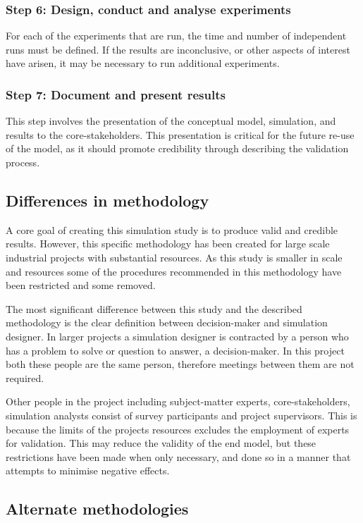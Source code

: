 \subsubsection{Step 6: Design, conduct and analyse experiments}
For each of the experiments that are run, the time and number of independent runs must be defined.
If the results are inconclusive, or other aspects of interest have arisen, it may be necessary to run additional experiments.

\subsubsection{Step 7: Document and present results}
This step involves the presentation of the conceptual model, simulation, and results to the core-stakeholders.
This presentation is critical for the future re-use of the model, as it should promote credibility through describing the validation process.

\subsection{Differences in methodology}
A core goal of creating this simulation study is to produce valid and credible results.
However, this specific methodology has been created for large scale industrial projects with substantial resources.
As this study is smaller in scale and resources some of the procedures recommended in this methodology have been restricted and some removed.

The most significant difference between this study and the described methodology is the clear definition between decision-maker and simulation designer.
In larger projects a simulation designer is contracted by a person who has a problem to solve or question to answer, a decision-maker.
In this project both these people are the same person, therefore meetings between them are not required.

Other people in the project including subject-matter experts, core-stakeholders, simulation analysts consist of survey participants and
project supervisors.
This is because the limits of the projects resources excludes the employment of experts for validation.
This may reduce the validity of the end model, but these restrictions have been made when only necessary,
and done so in a manner that attempts to minimise negative effects.

\subsection{Alternate methodologies}
